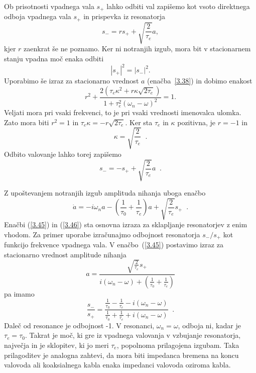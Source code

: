 Ob prisotnosti vpadnega vala $s_{+}$ lahko odbiti val zapišemo kot
vsoto direktnega odboja vpadnega vala $s_{+}$ in prispevka iz resonatorja
\begin{equation}
s_{-}=rs_{+}+\sqrt{\frac{2}{\tau_{e}}}a,
\label{3.41}
\end{equation}
kjer $r$ zaenkrat še ne poznamo. Ker ni notranjih izgub, mora bit v 
stacionarnem stanju vpadna moč enaka odbiti 
\begin{equation}
|s_{+}|^{2}=|s_{-}|^{2}.
\label{3.42}
\end{equation}
Uporabimo še izraz za stacionarno vrednost $a$  (enačba~\ref{3.38}) in dobimo
enakost 
\begin{equation}
r^{2}+\frac{2(\tau_{e}\kappa^{2}+r\kappa\sqrt{2\tau_{e}})}{1+\tau_{e}^{2}(\omega_{n}-\omega)^{2}}=1.
\label{3.43}
\end{equation}
 Veljati mora pri vsaki frekvenci, to je pri vsaki vrednosti imenovalca
ulomka. Zato mora biti $r^{2}=1$ in $\tau_{e}\kappa=-r\sqrt{2\tau_{e}}$.
Ker sta $\tau_{e}$ in $\kappa$ pozitivna, je $r=-1$ in 
\begin{equation}
\kappa=\sqrt{\frac{2}{\tau_{e}}}\;\;.\label{3.44}
\end{equation}
 Odbito valovanje lahko torej zapišemo 
\begin{equation}
s_{-}=-s_{+}+\sqrt{\frac{2}{\tau_{e}}}a\;\;.\label{3.45}
\end{equation}

Z upoštevanjem notranjih izgub amplituda nihanja uboga enačbo 
\begin{equation}
\dot{a}=-i\omega_{n}a-(\frac{1}{\tau_{0}}+\frac{1}{\tau_{e}})a+\sqrt{\frac{2}{\tau_{e}}}s_{+}\;\;.
\label{3.46}
\end{equation}
 Enačbi (\ref{3.45}) in (\ref{3.46}) sta osnovna izraza za sklapljanje
resonatorjev z enim vhodom. Za primer uporabe izračunajmo odbojnost
resonatorja $s_{-}/s_{+}$ kot funkcijo frekvence vpadnega vala. V
enačbo~(\ref{3.45}) postavimo izraz za stacionarno vrednost amplitude
nihanja 
\begin{equation}
a=\frac{\sqrt{\frac{2}{\tau_{e}}}s_{+}}{i(\omega_{n}-\omega)+(\frac{1}{\tau_{0}}+\frac{1}{\tau_{e}})}
\label{3.47}
\end{equation}
 pa imamo 
\begin{equation}
\frac{s_{-}}{s_{+}}=\frac{\frac{1}{\tau_{0}}-\frac{1}{\tau_{e}}-i(\omega_{n}-\omega)}{\frac{1}{\tau_{0}}
+\frac{1}{\tau_{e}}+i(\omega_{n}-\omega)}\;\;.\label{3.48}
\end{equation}
 Daleč od resonance je odbojnost -1. V resonanci, $\omega_{n}=\omega$,
odboja ni, kadar je $\tau_{e}=\tau_{0}$. Takrat je moč, ki gre iz
vpadnega valovanja v vzbujanje resonatorja, največja in je sklopitev,
ki jo meri $\tau_{e}$, popolnoma prilagojena izgubam. Taka prilagoditev
je analogna zahtevi, da mora biti impedanca bremena na koncu valovoda
ali koaksialnega kabla enaka impedanci valovoda oziroma kabla.

